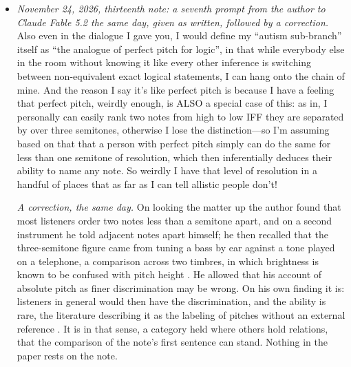 \begin{itemize}
\item \emph{November 24, 2026, thirteenth note: a seventh prompt from the author to Claude Fable 5.2 the same day, given as written, followed by a correction.} Also even in the dialogue I gave you, I would define my ``autism sub-branch'' itself as ``the analogue of perfect pitch for logic'', in that while everybody else in the room without knowing it like every other inference is switching between non-equivalent exact logical statements, I can hang onto the chain of mine. And the reason I say it's like perfect pitch is because I have a feeling that perfect pitch, weirdly enough, is ALSO a special case of this: as in, I personally can easily rank two notes from high to low IFF they are separated by over three semitones, otherwise I lose the distinction---so I'm assuming based on that that a person with perfect pitch simply can do the same for less than one semitone of resolution, which then inferentially deduces their ability to name any note. So weirdly I have that level of resolution in a handful of places that as far as I can tell allistic people don't!\par\smallskip\noindent\emph{A correction, the same day.} On looking the matter up the author found that most listeners order two notes less than a semitone apart, and on a second instrument he told adjacent notes apart himself; he then recalled that the three-semitone figure came from tuning a bass by ear against a tone played on a telephone, a comparison across two timbres, in which brightness is known to be confused with pitch height \cite{AllenOxenham2014}. He allowed that his account of absolute pitch as finer discrimination may be wrong. On his own finding it is: listeners in general would then have the discrimination, and the ability is rare, the literature describing it as the labeling of pitches without an external reference \cite{LevitinRogers2005}. It is in that sense, a category held where others hold relations, that the comparison of the note's first sentence can stand. Nothing in the paper rests on the note.
\end{itemize}
